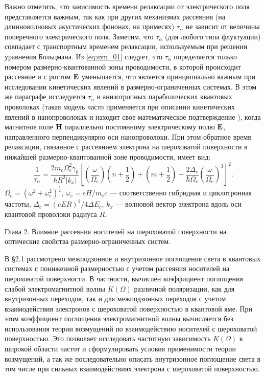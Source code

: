 Важно отметить, что зависимость времени релаксации от электрического поля представляется важным, так как при других механизмах рассеяния (на длинноволновых акустических фононах, на примесях) $\tau_\alpha$ не зависит от величины поперечного электрического поля. Заметим, что $\tau_\alpha$ (для любого типа флуктуации) совпадает с транспортным временем релаксации, используемым при решении уравнения Больцмана.
Из \eqref{eq:syn_01} следует, что $\tau_\alpha$ определяется только номером размерно-квантованной зоны проводимости, в которой происходит рассеяние и с ростом $\boldsymbol{\mathbf{E}}$ уменьшается, что является принципиально важным при исследовании кинетических явлений в размерно-ограниченных системах. В этом же параграфе исследуется $\tau_\alpha$ в анизотропных параболических квантовых проволоках (такая модель часто применяется при описании кинетических явлений в нанопроволоках \cite{Geiler1998,Geiler1999,Cros1992} и находит свое математическое подтверждение \cite{Beenakker1991}), когда магнитное поле $\boldsymbol{\mathbf{H}}$ параллельно постоянному электрическому полю $\boldsymbol{\mathbf{E}}$, направленного перпендикулярно оси нанопроволоки. При этом обратное время релаксации, связанное с рассеянием электрона на шероховатой поверхности в нижайшей размерно-квантованной зоне проводимости, имеет вид:
\begin{equation} \label{eq:syn_02}
\frac{1}{\tau_\alpha}=\frac{2m_e\Omega^2_e \gamma_0}{\hbar R^2 \left|k_x\right|} \left[\left(\frac{\omega}{\Omega_e}\right) \left(n+\frac{1}{2}\right)+ \left(m+\frac{1}{2}\right)+ \frac{2\Delta_c}{\hbar\Omega_e} \left(\frac{\omega}{\Omega_e}\right)^3\right]^2.
\end{equation}
$\Omega_e= \left( \omega^2 + \omega_c^2 \right)^{\frac{1}{2}}$, $\omega_c = eH/m_ec$ --- соответственно гибридная и циклотронная частоты, $\Delta_c = (eER)^2/4\Delta E_c$, $k_x$ --- волновой вектор электрона вдоль оси квантовой проволоки радиуса $R$.

Глава 2. Влияние рассеяния носителей на шероховатой поверхности на оптические свойства размерно-ограниченных систем.

В §2.1 рассмотрено межподзонное и внутризонное поглощение света в квантовых системах с пониженной размерностью с учетом рассеяния носителей на шероховатой поверхности. В частности, вычислен  коэффициент поглощения слабой электромагнитной волны $K\left(\Omega \right)$ различной поляризации, как для внутризонных переходов, так и для межподзонных переходов с учетом взаимодействия электронов с шероховатой поверхностью в квантовой яме. При этом коэффициент поглощения электромагнитной волны вычисляется без использования теории возмущений по взаимодействию носителей с шероховатой поверхностью. Это позволяет исследовать частотную зависимость $K(\Omega)$ в широкой области частот и сформулировать условия применимости теории возмущений, а так же последовательно описать внутризонное поглощение света в том числе при сильных взаимодействиях электрона с шероховатой поверхностью.	

